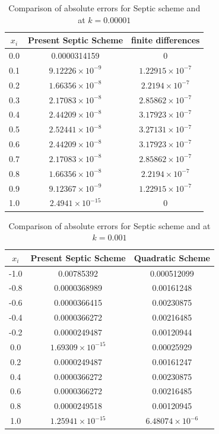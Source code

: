 \documentclass[10pt,letterpaper,twoside]{article}
\begin{document}
\begin{table}[H]
 \centering
 \small
 \caption{Comparison of absolute errors for Septic scheme and \cite{24} at $k = 0.00001$}
 \label{Table 0001}
 \renewcommand{\arraystretch}{1.1}
 \begin{tabular}{|c|c|c|}
  \hline
  \textbf{$x_{i}$} & \textbf{Present Septic Scheme} & \textbf{finite differences \cite{24}} \\ \hline 
  0.0   & 0.0000314159 & 0 \\ \hline
  0.1   & \(9.12226 \times 10^{-9}\) & \(1.22915 \times 10^{-7}\) \\ \hline
  0.2   & \(1.66356 \times 10^{-8}\) & \(2.2194 \times 10^{-7}\) \\ \hline
  0.3   & \(2.17083 \times 10^{-8}\) & \(2.85862 \times 10^{-7}\) \\ \hline
  0.4   & \(2.44209 \times 10^{-8}\) & \(3.17923 \times 10^{-7}\) \\ \hline
  0.5   & \(2.52441 \times 10^{-8}\) & \(3.27131 \times 10^{-7}\) \\ \hline
  0.6   & \(2.44209 \times 10^{-8}\) & \(3.17923 \times 10^{-7}\) \\ \hline
  0.7   & \(2.17083 \times 10^{-8}\) & \(2.85862 \times 10^{-7}\) \\ \hline
  0.8   & \(1.66356 \times 10^{-8}\) & \(2.2194 \times 10^{-7}\) \\ \hline
  0.9   & \(9.12367 \times 10^{-9}\) & \(1.22915 \times 10^{-7}\) \\ \hline
  1.0   & \(2.4941 \times 10^{-15}\) & 0 \\ \hline
 \end{tabular}
\end{table}

\begin{table}[H]
 \centering
 \small
 \caption{Comparison of absolute errors for Septic scheme and \cite{38} at $k = 0.001$}
 \label{Table 001}
 \renewcommand{\arraystretch}{1.1}
 \begin{tabular}{|c|c|c|}
  \hline
  \textbf{$x_{i}$} & \textbf{Present Septic Scheme} & \textbf{Quadratic Scheme \cite{38}} \\ \hline 
 -1.0   & 0.00785392 & 0.000512099 \\ \hline
 -0.8   & 0.0000368989 & 0.00161248  \\ \hline
 -0.6   & 0.0000366415 & 0.00230875  \\ \hline
 -0.4   & 0.0000366272 & 0.00216485  \\ \hline
 -0.2   & 0.0000249487 & 0.00120944  \\ \hline
 0.0    & \(1.69309 \times 10^{-15}\) & 0.00025929  \\ \hline
 0.2    & 0.0000249487 & 0.00161247  \\ \hline
 0.4    & 0.0000366272 & 0.00230875 \\ \hline
 0.6    & 0.0000366272 & 0.00216485 \\ \hline
 0.8    & 0.0000249518 & 0.00120945 \\ \hline
 1.0    & \(1.25941 \times 10^{-15}\) & \(6.48074 \times 10^{-6}\)  \\ \hline
 \end{tabular}
\end{table}
\end{document}
